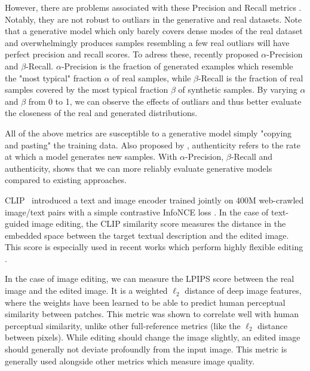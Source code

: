 However, there are problems associated with these Precision and Recall metrics \citep{naeem2020reliable, alaa2022faithful}.
Notably, they are not robust to outliars in the generative and real datasets. Note that a generative model which only barely 
covers dense modes of the real dataset and overwhelmingly 
produces samples resembling a few real outliars will have perfect precision and recall scores. To adress these, 
\cite{alaa2022faithful} recently proposed $\alpha$-Precision and $\beta$-Recall. $\alpha$-Precision is the 
fraction of generated examples which resemble the "most typical" fraction $\alpha$ of real samples, while  $\beta$-Recall
is the fraction of real samples covered by the most typical fraction $\beta$ of synthetic samples. By varying 
$\alpha$ and $\beta$ from 0 to 1, we can observe the effects of outliars and thus better evaluate the closeness 
of the real and generated distributions. 

 All of the above metrics are susceptible to a generative model simply "copying and pasting" 
the training data. Also proposed by \cite{alaa2022faithful}, authenticity refers to the rate at which 
a model generates new samples. With  $\alpha$-Precision, $\beta$-Recall and authenticity, \cite{alaa2022faithful}
shows that we can more reliably evaluate generative models compared to existing approaches. 

 \ac{CLIP}~\cite{radford2021learning} introduced a text and image encoder trained 
jointly on 400M web-crawled image/text pairs 
with a simple contrastive InfoNCE loss \citep{oord18arxiv}. In the case of text-guided image editing, 
the \ac{CLIP} similarity score measures the distance in the embedded space 
between the target textual description and the edited image.  This score is especially used in recent 
works which perform highly flexible editing \citep{mokady2023null, hertz2022prompt}.

\label{sec:related_lpips}
In the case of image editing, we can measure the LPIPS \citep{zhanglpips2018} score between 
the real image and the edited image. It is a weighted $\ell_2$ distance of deep image features, 
where the weights have been learned to be able to predict human perceptual similarity  between patches.
This metric was shown to correlate well with human perceptual similarity, unlike other full-reference metrics
 (like the $\ell_2$ distance between pixels). While editing should change the image slightly, an 
edited image should generally not deviate profoundly from the input image. This metric 
is generally used alongside  other metrics which measure image quality. 

